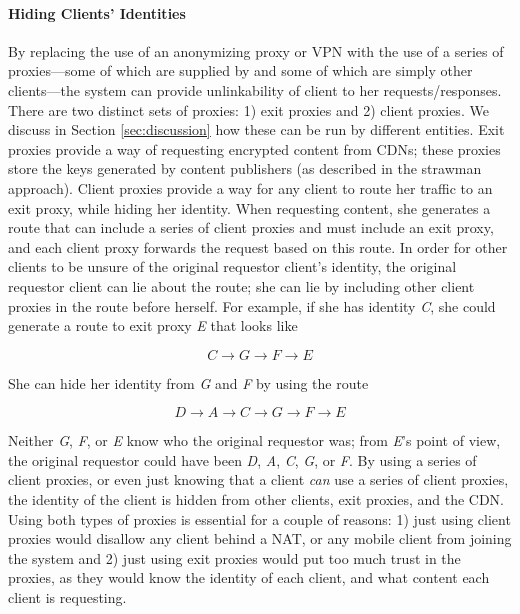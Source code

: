 \paragraph{Hiding Clients' Identities} By replacing the use of an anonymizing proxy or VPN with the use of 
a series of proxies---some of which are supplied by \system{} and some of which are simply other clients---the 
system can provide unlinkability of client to her requests/responses. There are two distinct sets of 
proxies: 1) exit proxies and 2) client proxies.  We discuss in Section \ref{sec:discussion} how these can be run by different 
entities.  Exit proxies provide a way of requesting encrypted content from CDNs; these proxies store the keys generated 
by content publishers (as described in the strawman approach).  Client proxies provide 
a way for any client to route her traffic to an exit proxy, while hiding her identity.  When requesting content, she 
generates a route that can include a series of client proxies and must include an exit proxy, and each client proxy 
forwards the request based on this route.  In order for other clients to be unsure of the original requestor client's 
identity, the original requestor client can lie about the route; she can lie by including other client proxies 
in the route before herself.  For example, if she has identity {\it C}, she could generate a route to exit proxy {\it E} that 
looks like 

\[C \rightarrow G \rightarrow F \rightarrow E\] 

\noindent She can hide her identity from {\it G} and {\it F} by using the route 

\[D \rightarrow A \rightarrow C \rightarrow G \rightarrow F \rightarrow E\]  

\noindent Neither {\it G}, {\it F}, or {\it E} know who the original requestor was; from {\it E}'s point of 
view, the original requestor could have been {\it D}, {\it A}, {\it C}, {\it G}, or {\it F}.  By using a series of 
client proxies, or even just knowing that a client {\it can} use a series of client proxies, the identity of the client is 
hidden from other clients, exit proxies, and the CDN.  Using both types of proxies is essential for a couple of 
reasons: 1) just using client proxies would disallow any client behind a NAT, or any mobile client from joining 
the system and 2) just using exit proxies would put too much trust in the proxies, as they would know the identity 
of each client, and what content each client is requesting.


